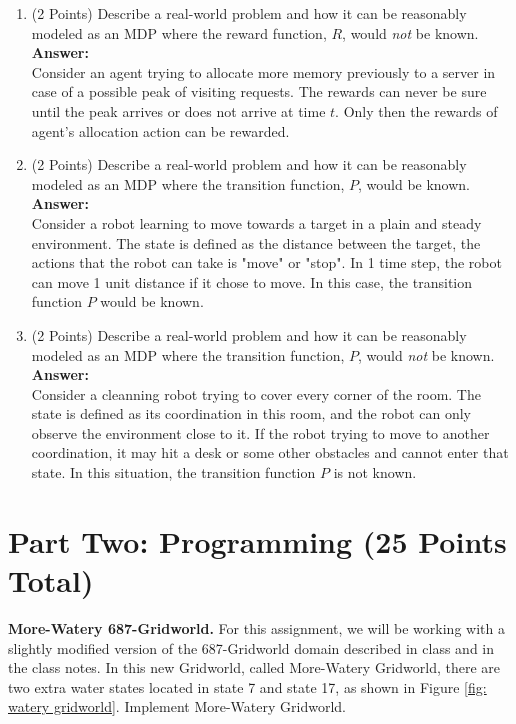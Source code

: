 \documentclass[]{article}
\begin{document}
\begin{enumerate}
    \item (2 Points) Describe a real-world problem and how it can be reasonably modeled as an MDP where the reward function, $R$, would \emph{not} be known. \\
    \textbf{Answer:}\\
    Consider an agent trying to allocate more memory previously to a server in case of a possible peak of visiting requests. The rewards can never be sure until the peak arrives or does not arrive at time $t$. Only then the rewards of agent's allocation action can be rewarded.
    
    \item (2 Points) Describe a real-world problem and how it can be reasonably modeled as an MDP where the transition function, $P$, would be known.\\
    \textbf{Answer:}\\
    Consider a robot learning to move towards a target in a plain and steady environment. The state is defined as the distance between the target, the actions that the robot can take is "move" or "stop". In 1 time step, the robot can move 1 unit distance if it chose to move. In this case, the transition function $P$ would be known.
    
    \item (2 Points) Describe a real-world problem and how it can be reasonably modeled as an MDP where the transition function, $P$, would \emph{not} be known.\\
    \textbf{Answer:}\\
    Consider a cleanning robot trying to cover every corner of the room. The state is defined as its coordination in this room, and the robot can only observe the environment close to it. If the robot trying to move to another coordination, it may hit a desk or some other obstacles and cannot enter that state. In this situation, the transition function $P$ is not known.
    
\end{enumerate}

\section*{Part Two: Programming (25 Points Total)}

\noindent\textbf{More-Watery 687-Gridworld.} For this assignment, we will be working with a slightly modified version of the 687-Gridworld domain described in class and in the class notes. In this new Gridworld, called More-Watery Gridworld, there are two extra water states located in state 7 and state 17, as shown in Figure \ref{fig: watery gridworld}. Implement More-Watery Gridworld. 
\end{document}
